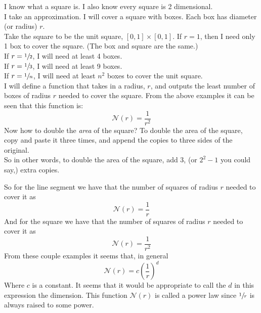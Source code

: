\documentclass[11pt]{ekblite}
\begin{document}
\begin{example}[Square]
	I know what a square is. I also know every square is 2 dimensional.
	\\[0.2in]I take an approximation. I will cover a square with boxes. Each box has diameter (or radius) $r$.
	\\[0.2in]Take the square to be the unit square, $[0,1] \times [0,1]$. If $r = 1$, then I need only 1 box to cover the square. (The box and square are the same.)
	\\[0.2in]If $r = \sfrac{1}{2}$, I will need at least 4 boxes.
	\\[0.2in]If $r = \sfrac{1}{3}$, I will need at least 9 boxes.
	\\[0.2in]If $r = \sfrac{1}{n}$, I will need at least $n^2$ boxes to cover the unit square.
	\\[0.2in]I will define a function that takes in a radius, $r$, and outputs the least number of boxes of radius $r$ needed to cover the square. From the above examples it can be seen that this function is:
	\[\mathcal{N}(r) = \frac{1}{r^2}\]
	Now how to double the \textit{area} of the square? To double the area of the square, copy and paste it three times, and append the copies to three sides of the original. 
	\\[0.2in]So in other words, to double the area of the square, add 3, (or $2^2 - 1$ you could say,) extra copies.
\end{example}
So for the line segment we have that the number of squares of radius $r$ needed to cover it as
\[\mathcal{N}(r) = \frac{1}{r}\]
And for the square we have that the number of squares of radius $r$ needed to cover it as
\[\mathcal{N}(r) = \frac{1}{r^2}\]
From these couple examples it seems that, in general
\[\mathcal{N}(r) = c \left(\frac{1}{r}\right)^d\]
Where $c$ is a constant. It seems that it would be appropriate to call the $d$ in this expression the dimension. This function $\mathcal{N}(r)$ is called a power law since $\sfrac{1}{r}$ is always raised to some power. \cite{falconer2}

\newpage
\end{document}
